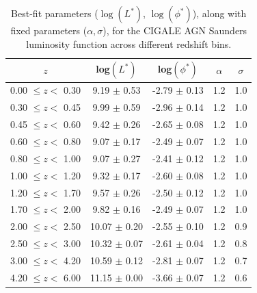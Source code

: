 \begin{table}
    \caption{Best-fit parameters ($\log(L^*)$, $\log(\phi^*)$), along with fixed parameters ($\alpha, \sigma$), for the CIGALE AGN Saunders luminosity function across different redshift bins.}
    \label{Tab: Param Evo AGN}
    \begin{center}
    \begin{tabular}{ccccc}
        \toprule
        $z$ & log$(L^{*})$ & log$(\phi^{*})$ & $\alpha$ & $\sigma$ \\
        \hline
        0.00 $\leq z <$ 0.30 &  9.19 $\pm$ 0.53 & -2.79 $\pm$ 0.13 & 1.2 & 1.0 \\
        0.30 $\leq z <$ 0.45 &  9.99 $\pm$ 0.59 & -2.96 $\pm$ 0.14 & 1.2 & 1.0 \\
        0.45 $\leq z <$ 0.60 &  9.42 $\pm$ 0.26 & -2.65 $\pm$ 0.08 & 1.2 & 1.0 \\
        0.60 $\leq z <$ 0.80 &  9.07 $\pm$ 0.17 & -2.49 $\pm$ 0.07 & 1.2 & 1.0 \\
        0.80 $\leq z <$ 1.00 &  9.07 $\pm$ 0.27 & -2.41 $\pm$ 0.12 & 1.2 & 1.0 \\
        1.00 $\leq z <$ 1.20 &  9.32 $\pm$ 0.17 & -2.60 $\pm$ 0.08 & 1.2 & 1.0 \\
        1.20 $\leq z <$ 1.70 &  9.57 $\pm$ 0.26 & -2.50 $\pm$ 0.12 & 1.2 & 1.0 \\
        1.70 $\leq z <$ 2.00 &  9.82 $\pm$ 0.16 & -2.49 $\pm$ 0.07 & 1.2 & 1.0 \\
        2.00 $\leq z <$ 2.50 & 10.07 $\pm$ 0.20 & -2.55 $\pm$ 0.10 & 1.2 & 0.9 \\
        2.50 $\leq z <$ 3.00 & 10.32 $\pm$ 0.07 & -2.61 $\pm$ 0.04 & 1.2 & 0.8 \\
        3.00 $\leq z <$ 4.20 & 10.59 $\pm$ 0.12 & -2.81 $\pm$ 0.07 & 1.2 & 0.7 \\
        4.20 $\leq z <$ 6.00 & 11.15 $\pm$ 0.00 & -3.66 $\pm$ 0.07 & 1.2 & 0.6 \\     
        \bottomrule
    \end{tabular}
    \end{center}
\end{table}

